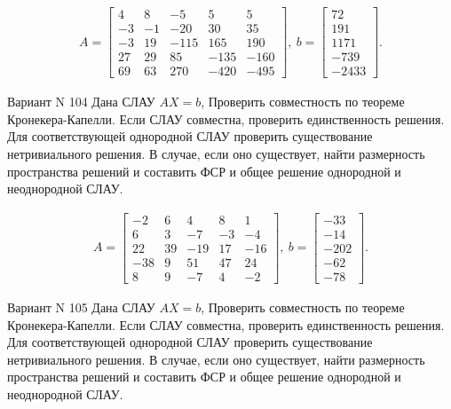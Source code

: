 \documentclass[11pt]{report}
\begin{document}
\begin{align*}
 A = \left[\begin{matrix}4 & 8 & -5 & 5 & 5\\-3 & -1 & -20 & 30 & 35\\-3 & 19 & -115 & 165 & 190\\27 & 29 & 85 & -135 & -160\\69 & 63 & 270 & -420 & -495\end{matrix}\right],
\ b = \left[\begin{matrix}72\\191\\1171\\-739\\-2433\end{matrix}\right]. 
 \end{align*}

Вариант N 104
Дана СЛАУ $AX = b$,
Проверить совместность по теореме Кронекера-Капелли. Если СЛАУ совместна, проверить единственность решения.
Для соответствующей однородной СЛАУ проверить существование нетривиального решения. В случае, если оно существует,
найти размерность пространства решений и составить ФСР и общее решение однородной  и неоднородной СЛАУ.


\begin{align*}
 A = \left[\begin{matrix}-2 & 6 & 4 & 8 & 1\\6 & 3 & -7 & -3 & -4\\22 & 39 & -19 & 17 & -16\\-38 & 9 & 51 & 47 & 24\\8 & 9 & -7 & 4 & -2\end{matrix}\right],
\ b = \left[\begin{matrix}-33\\-14\\-202\\-62\\-78\end{matrix}\right]. 
 \end{align*}

Вариант N 105
Дана СЛАУ $AX = b$,
Проверить совместность по теореме Кронекера-Капелли. Если СЛАУ совместна, проверить единственность решения.
Для соответствующей однородной СЛАУ проверить существование нетривиального решения. В случае, если оно существует,
найти размерность пространства решений и составить ФСР и общее решение однородной  и неоднородной СЛАУ.
\end{document}
